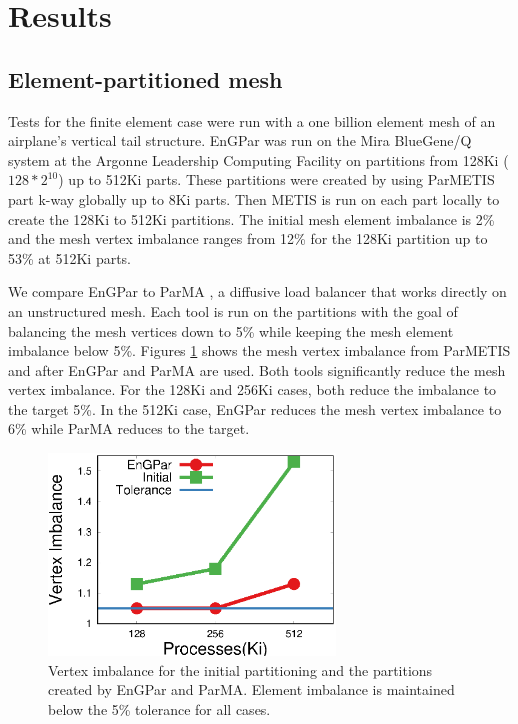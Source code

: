 \documentclass[conference]{IEEEtran}
\begin{document}
\section{Results} \label{sec:results}

\subsection{Element-partitioned mesh}

Tests for the finite element case were run with a one billion element mesh of an airplane's
vertical tail structure. EnGPar was run on the Mira BlueGene/Q system at the Argonne Leadership
Computing Facility \cite{haring2012ibm} on partitions from 128Ki ($128*2^{10}$) up to 512Ki parts.
These partitions were created by using ParMETIS part k-way \cite{karypis1999parallel} globally
up to 8Ki parts. Then METIS is run on each part locally to create the 128Ki to 512Ki partitions.
The initial mesh element imbalance is 2\% and the mesh vertex imbalance ranges from 12\% for
the 128Ki partition up to 53\% at 512Ki parts.

We compare EnGPar to ParMA \cite{SmithParma2015}, a diffusive load balancer that
works directly on an unstructured mesh.
Each tool is run on the partitions with the goal of balancing the mesh vertices down to 5\%
while keeping the mesh
element imbalance below 5\%. Figures \ref{fig:fem_vtximb} shows the mesh vertex imbalance from
ParMETIS and after EnGPar and ParMA are used. Both tools significantly reduce the mesh vertex
imbalance. For the 128Ki and 256Ki cases, both reduce the imbalance to the target 5\%. In
the 512Ki case, EnGPar reduces the mesh vertex imbalance to 6\% while ParMA reduces to the
target.

\begin{figure}[!ht]
  \centering
  \includegraphics[width=3in]{plots/mira_fem_results/vimb_v_cores}
  \caption{Vertex imbalance for the initial partitioning and the partitions created by
    EnGPar and ParMA. Element imbalance is maintained below the 5\% tolerance for all cases.}
  \label{fig:fem_vtximb}
\end{figure}
\end{document}
